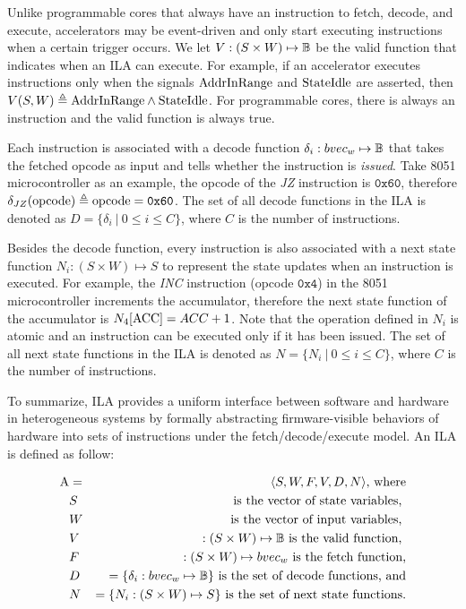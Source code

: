 Unlike programmable cores that always have an instruction to fetch, decode, and
execute, accelerators may be event-driven and only start executing instructions 
when a certain trigger occurs. 
We let $V : (S \times W) \mapsto \mathbb{B}$ be the valid function that indicates when 
an ILA can execute.
%
For example, if an accelerator executes instructions only when the signals 
$\mathrm{AddrInRange}$ and $\mathrm{StateIdle}$ are asserted, then 
$V(S, W) \triangleq \mathrm{AddrInRange} \wedge \mathrm{StateIdle}$.
For programmable cores, there is always an instruction and the valid function 
is always true.

Each instruction is associated with a decode function 
$\delta_i : bvec_w \mapsto \mathbb{B}$ that takes the fetched opcode as input and 
tells whether the instruction is \textit{issued}.
Take 8051 microcontroller as an example, the opcode of the \textit{JZ} 
instruction is $\texttt{0x60}$, therefore 
$\delta_{JZ} (\mathrm{opcode}) \triangleq \mathrm{opcode} = \texttt{0x60}$.
The set of all decode functions in the ILA is denoted as 
$D = \{ \delta_i ~|~ 0 \leq i \leq C \}$, where $C$ is the number of 
instructions.

Besides the decode function, every instruction is also associated with a 
next state function $N_i : (S \times W) \mapsto S$ to represent the state updates 
when an instruction is executed.
For example, the \textit{INC} instruction (opcode $\texttt{0x4}$) in the 8051 
microcontroller increments the accumulator, therefore the next state function 
of the accumulator is $N_4[\mathrm{ACC}] = ACC + 1$. 
Note that the operation defined in $N_i$ is atomic and an instruction can be 
executed only if it has been issued.
The set of all next state functions in the ILA is denoted as 
$N = \{ N_i ~|~ 0 \leq i \leq C \}$, where $C$ is the number of instructions.

To summarize, ILA provides a uniform interface between software and hardware 
in heterogeneous systems by formally abstracting firmware-visible behaviors of 
hardware into sets of instructions under the fetch/decode/execute model. 
An ILA is defined as follow:

\begin{eqnarray}
  \mathrm{A} &=& \langle S, W, F, V, D, N \rangle \text{, where} \nonumber \\
      &S& \text{ is the vector of state variables, } \nonumber \\
      &W& \text{ is the vector of input variables, } \nonumber \\
      &V& :(S\times W) \mapsto \mathbb{B} \text{ is the valid function, } \nonumber \\
      &F& :(S\times W) \mapsto bvec_w \text{ is the fetch function,} \nonumber \\
      &D& = \{ \delta_i : bvec_w \mapsto \mathbb{B} \} 
            \text{ is the set of decode functions, and} \nonumber \\
      &N& = \{ N_i : (S \times W) \mapsto S \} 
            \text{ is the set of next state functions.} \nonumber
\end{eqnarray}

